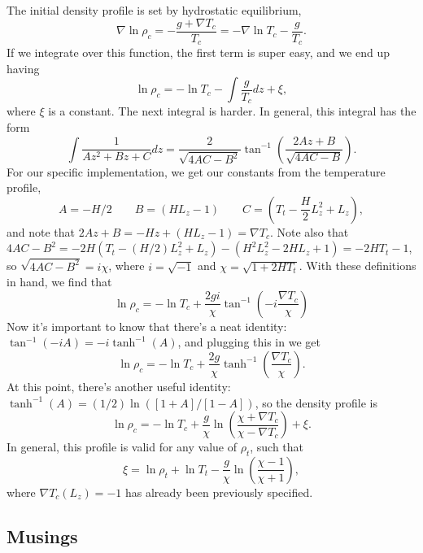 \documentclass[aps, pre, onecolumn, nofootinbib, notitlepage, groupedaddress, amsfonts, amssymb, amsmath, longbibliography]{revtex4-1}
\newcommand{\grad}{\ensuremath{\nabla}}
\begin{document}
The initial density profile is set by hydrostatic equilibrium,
\begin{equation}
\grad\ln\rho_c = -\frac{g + \grad T_c}{T_c} = -\grad\ln T_c- \frac{g}{T_c}.
\end{equation}
If we integrate over this function, the first term is super easy, and we end up having
\begin{equation}
\ln\rho_c = - \ln T_c - \int\frac{g}{T_c}dz + \xi,
\end{equation}
where $\xi$ is a constant.  The next integral is harder.  In general, this integral has the form
\begin{equation}
\int \frac{1}{Az^2 + Bz + C}dz = \frac{2}{\sqrt{4 AC - B^2}} \tan^{-1}\left(\frac{2 Az + B}{\sqrt{4 AC - B}}\right).
\end{equation}
For our specific implementation, we get our constants from the temperature profile,
$$
A = -H / 2 \qquad B = (HL_z - 1) \qquad C = \left(T_t - \frac{H}{2}L_z^2 + L_z\right),
$$
and note that $2Az + B = -Hz + (HL_z - 1) = \grad T_c$.  Note also that
$4AC - B^2 = -2H(T_t - (H/2)L_z^2 + L_z) - (H^2 L_z^2 - 2HL_z + 1) = -2HT_t - 1$,
so $\sqrt{4AC - B^2} = i\chi$, where $i = \sqrt{-1}$ and $\chi = \sqrt{1 + 2HT_t}$.
With these definitions in hand, we find that
\begin{equation}
\ln\rho_c = -\ln T_c + \frac{2 g i}{\chi}\tan^{-1}\left(-i\frac{\grad T_c}{\chi}\right)
\end{equation}
Now it's important to know that there's a neat identity: $\tan^{-1}(-i A) = -i\tanh^{-1}(A)$,
and plugging this in we get
\begin{equation}
\ln\rho_c = -\ln T_c + \frac{2 g}{\chi}\tanh^{-1}\left(\frac{\grad T_c}{\chi}\right).
\end{equation}
At this point, there's another useful identity: $\tanh^{-1}(A) = (1/2)\ln([1 + A]/[1 - A])$,
so the density profile is
\begin{equation}
\ln\rho_c = -\ln T_c + \frac{g}{\chi}\ln\left(\frac{\chi + \grad T_c}{\chi - \grad T_c}\right) + \xi.
\end{equation}
In general, this profile is valid for any value of $\rho_t$, such that
\begin{equation}
\xi = \ln\rho_t + \ln T_t - \frac{g}{\chi}\ln\left(\frac{\chi - 1}{\chi + 1}\right),
\end{equation}
where $\grad T_c(L_z) = -1$ has already been previously specified.


\subsection{Musings}
\end{document}
